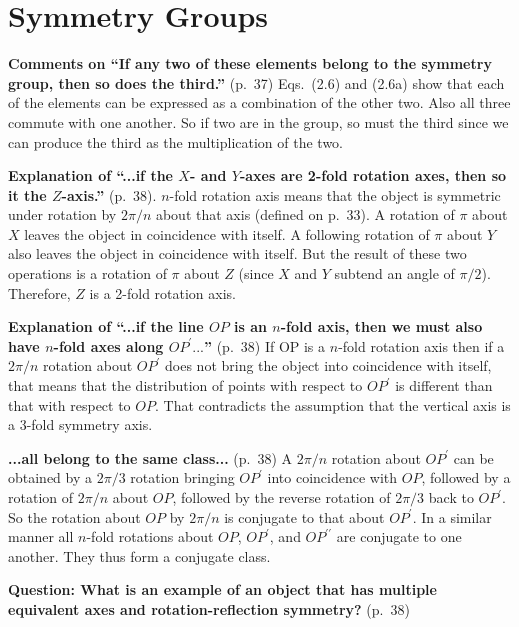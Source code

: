 \chapter{Symmetry Groups}

{\bf Comments on ``If any two of these elements belong to the symmetry
  group, then so does the third.''} (p.\ 37) Eqs.\ (2.6) and (2.6a)
show that each of the elements can be expressed as a combination of
the other two. Also all three commute with one another. So if two are
in the group, so must the third since we can produce the third as the
multiplication of the two.

{\bf Explanation of ``...if the $X$- and $Y$-axes are 2-fold rotation
  axes, then so it the $Z$-axis.''} (p.\ 38). $n$-fold rotation axis
means that the object is symmetric under rotation by $2\pi/n$ about
that axis (defined on p.\ 33).  A rotation of $\pi$ about $X$ leaves
the object in coincidence with itself. A following rotation of $\pi$
about $Y$ also leaves the object in coincidence with itself. But the
result of these two operations is a rotation of $\pi$ about $Z$ (since
$X$ and $Y$ subtend an angle of $\pi/2$). Therefore, $Z$ is a 2-fold
rotation axis.

{\bf Explanation of ``...if the line $OP$ is an $n$-fold axis, then we
  must also have $n$-fold axes along $OP^\prime...$''} (p.\ 38) If OP
is a $n$-fold rotation axis then if a $2\pi/n$ rotation about $OP^\prime$
does not bring the object into coincidence with itself, that means
that the distribution of points with respect to $OP^\prime$ is
different than that with respect to $OP$. That contradicts the
assumption that the vertical axis is a 3-fold symmetry axis.

{\bf ...all belong to the same class...} (p.\ 38) A $2\pi/n$ rotation about
$OP^\prime$ can be obtained by a $2\pi/3$ rotation bringing $OP^\prime$ into
coincidence with $OP$, followed by a rotation of $2\pi/n$ about $OP$,
followed by the reverse rotation of $2\pi/3$ back to $OP^\prime$. So the
rotation about $OP$ by $2\pi/n$ is conjugate to that about $OP^\prime$. In a
similar manner all $n$-fold rotations about $OP$, $OP^\prime$, and
$OP^{\prime\prime}$ are conjugate to one another. They thus form a
conjugate class.

{\bf Question: What is an example of an object that has multiple equivalent axes and rotation-reflection symmetry?} (p.\ 38)
